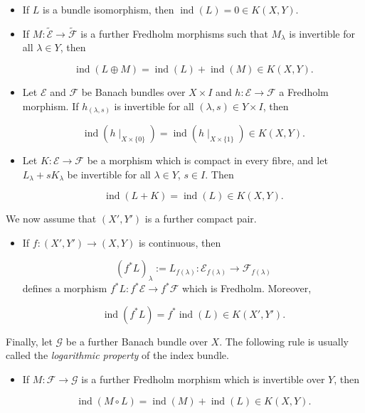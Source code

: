 \documentclass[a4paper,10pt]{article}
\DeclareMathOperator{\ind}{ind}
\begin{document}
\begin{itemize}
\item If $L$ is a bundle isomorphism, then $\ind(L)=0\in K(X,Y)$.
\item If $M:\tilde{\mathcal{E}}\rightarrow\tilde{\mathcal{F}}$ is a further Fredholm morphisms such that $M_\lambda$ is invertible for all $\lambda\in Y$, then

\[\ind(L\oplus M)=\ind(L)+\ind(M)\in K(X,Y).\]
\item Let $\mathcal{E}$ and $\mathcal{F}$ be Banach bundles over $X\times I$ and $h:\mathcal{E}\rightarrow\mathcal{F}$ a Fredholm morphism. If $h_{(\lambda,s)}$ is invertible for all $(\lambda,s)\in Y\times I$, then

\[\ind(h\mid_{X\times\{0\}})=\ind(h\mid_{X\times\{1\}})\in K(X,Y).\]
\item Let $K:\mathcal{E}\rightarrow\mathcal{F}$ be a morphism which is compact in every fibre, and let $L_\lambda+sK_\lambda$ be invertible for all $\lambda\in Y$, $s\in I$. Then

\[\ind(L+K)=\ind(L)\in K(X,Y).\]
\end{itemize}
\noindent
We now assume that $(X',Y')$ is a further compact pair.

\begin{itemize}
\item If $f:(X',Y')\rightarrow(X,Y)$ is continuous, then 

\[(f^\ast L)_\lambda:=L_{f(\lambda)}:\mathcal{E}_{f(\lambda)}\rightarrow\mathcal{F}_{f(\lambda)}\]
defines a morphism $f^\ast L:f^\ast\mathcal{E}\rightarrow f^\ast\mathcal{F}$ which is Fredholm. Moreover,

\[\ind(f^\ast L)=f^\ast\ind(L)\in K(X',Y').\]
\end{itemize}
\noindent
Finally, let $\mathcal{G}$ be a further Banach bundle over $X$. The following rule is usually called the \textit{logarithmic property} of the index bundle.

\begin{itemize}
\item If $M:\mathcal{F}\rightarrow\mathcal{G}$ is a further Fredholm morphism which is invertible over $Y$, then

\[\ind(M\circ L)=\ind(M)+\ind(L)\in K(X,Y).\]
\end{itemize}

 

\end{document}
